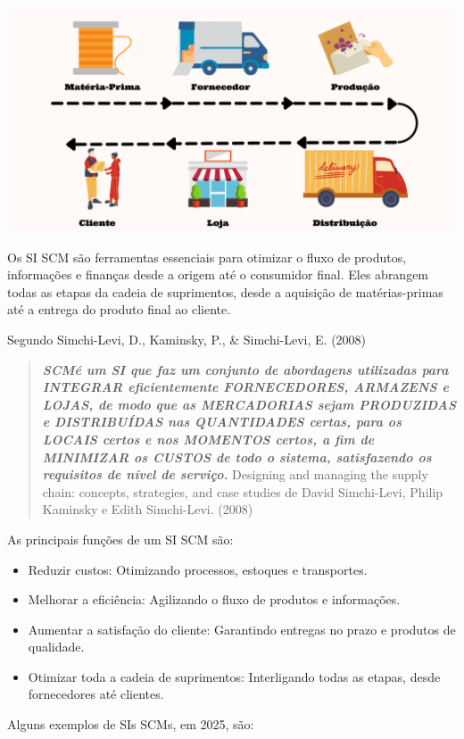 \documentclass[
]{book}
\begin{document}
\includegraphics[width=7.4375in,height=\textheight]{images/sistemas/SCM.png}

Os SI SCM são ferramentas essenciais para otimizar o fluxo de produtos, informações e finanças desde a origem até o consumidor final. Eles abrangem todas as etapas da cadeia de suprimentos, desde a aquisição de matérias-primas até a entrega do produto final ao cliente.

Segundo Simchi-Levi, D., Kaminsky, P., \& Simchi-Levi, E. (2008)

\begin{quote}
\textbf{\emph{SCMé um SI que faz um conjunto de abordagens utilizadas para INTEGRAR eficientemente FORNECEDORES, ARMAZENS e LOJAS, de modo que as MERCADORIAS sejam PRODUZIDAS e DISTRIBUÍDAS nas QUANTIDADES certas, para os LOCAIS certos e nos MOMENTOS certos, a fim de MINIMIZAR os CUSTOS de todo o sistema, satisfazendo os requisitos de nível de serviço.}} Designing and managing the supply chain: concepts, strategies, and case studies de David Simchi-Levi, Philip Kaminsky e Edith Simchi-Levi. (2008)
\end{quote}

As principais funções de um SI SCM são:

\begin{itemize}
\item
  Reduzir custos: Otimizando processos, estoques e transportes.
\item
  Melhorar a eficiência: Agilizando o fluxo de produtos e informações.
\item
  Aumentar a satisfação do cliente: Garantindo entregas no prazo e produtos de qualidade.
\item
  Otimizar toda a cadeia de suprimentos: Interligando todas as etapas, desde fornecedores até clientes.
\end{itemize}

Alguns exemplos de SIs SCMs, em 2025, são:
\end{document}
